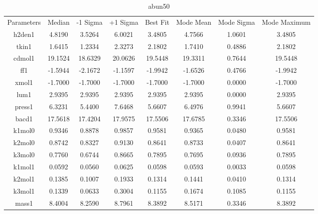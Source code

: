 \begin{table}
\caption{abun50}
\begin{tabular}{cccccccc}
Parameters & Median & -1 Sigma & +1 Sigma & Best Fit & Mode Mean & Mode Sigma & Mode Maximum \\
h2den1 & 4.8190 & 3.5264 & 6.0021 & 3.4805 & 4.7566 & 1.0601 & 3.4805 \\
tkin1 & 1.6415 & 1.2334 & 2.3273 & 2.1802 & 1.7410 & 0.4886 & 2.1802 \\
cdmol1 & 19.1524 & 18.6329 & 20.0626 & 19.5448 & 19.3311 & 0.7644 & 19.5448 \\
ff1 & -1.5944 & -2.1672 & -1.1597 & -1.9942 & -1.6526 & 0.4766 & -1.9942 \\
xmol1 & -1.7000 & -1.7000 & -1.7000 & -1.7000 & -1.7000 & 0.0000 & -1.7000 \\
lum1 & 2.9395 & 2.9395 & 2.9395 & 2.9395 & 2.9395 & 0.0000 & 2.9395 \\
press1 & 6.3231 & 5.4400 & 7.6468 & 5.6607 & 6.4976 & 0.9941 & 5.6607 \\
bacd1 & 17.5618 & 17.4204 & 17.9575 & 17.5506 & 17.6785 & 0.3346 & 17.5506 \\
k1mol0 & 0.9346 & 0.8878 & 0.9857 & 0.9581 & 0.9365 & 0.0480 & 0.9581 \\
k2mol0 & 0.8742 & 0.8327 & 0.9130 & 0.8641 & 0.8733 & 0.0407 & 0.8641 \\
k3mol0 & 0.7760 & 0.6744 & 0.8665 & 0.7895 & 0.7695 & 0.0936 & 0.7895 \\
k1mol1 & 0.0592 & 0.0560 & 0.0625 & 0.0598 & 0.0593 & 0.0033 & 0.0598 \\
k2mol1 & 0.1385 & 0.1007 & 0.1933 & 0.1314 & 0.1441 & 0.0410 & 0.1314 \\
k3mol1 & 0.1339 & 0.0633 & 0.3004 & 0.1155 & 0.1674 & 0.1085 & 0.1155 \\
mass1 & 8.4004 & 8.2590 & 8.7961 & 8.3892 & 8.5171 & 0.3346 & 8.3892 \\
\end{tabular}
\end{table}
